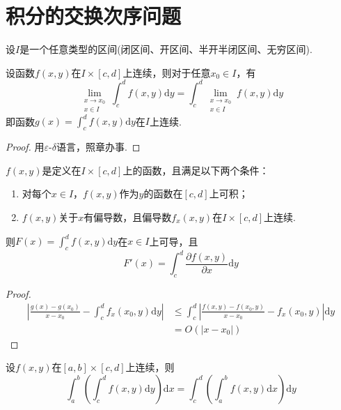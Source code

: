 \section{积分的交换次序问题}

设$I$是一个任意类型的区间(闭区间、开区间、半开半闭区间、无穷区间).

\begin{theorem}[极限与积分交换次序]\label{thm:limit-and-integral-exchange}
    设函数$f(x,y)$在$I\times [c,d]$上连续，则对于任意$x_0\in I$，有
    \[
        \lim_{\substack{x\to x_0\\x\in I}}\int_c^d f(x,y)\mathrm{d} y = \int_c^d \lim_{\substack{x\to x_0\\x\in I}}f(x,y)\mathrm{d} y
    \]
    即函数$g(x)=\int_c^d f(x,y)\mathrm{d} y$在$I$上连续.
\end{theorem}

\begin{proof}
    用$\varepsilon$-$\delta$语言，照章办事.
\end{proof}

\begin{theorem}[导数与积分交换次序]\label{thm:derivative-and-integral-exchange}
    $f(x,y)$是定义在$I\times [c,d]$上的函数，且满足以下两个条件：
    \begin{enumerate}
        \item 对每个$x\in I$，$f(x,y)$作为$y$的函数在$[c,d]$上可积；
        \item $f(x,y)$关于$x$有偏导数，且偏导数$f_x(x,y)$在$I\times [c,d]$上连续.
    \end{enumerate}
    则$F(x)=\int_c^d f(x,y)\mathrm{d} y$在$x\in I$上可导，且
    \[
        F'(x)=\int_c^d \frac{\partial f(x,y)}{\partial x}\mathrm{d} y
    \]
\end{theorem}

\begin{proof}
    \begin{align*}
        \left|\frac{g(x)-g\left(x_0\right)}{x-x_0}-\int_c^d f_x\left(x_0, y\right) \mathrm{d} y\right| &\leqslant \int_c^d\left|\frac{f(x, y)-f\left(x_0, y\right)}{x-x_0}-f_x\left(x_0, y\right)\right| \mathrm{d} y \\
        &=O(|x-x_0|)
    \end{align*}
\end{proof}

\begin{theorem}[积分交换次序]\label{thm:integral-exchange}
    设$f(x,y)$在$[a,b]\times [c,d]$上连续，则
    \[
        \int_a^b\left(\int_c^d f(x,y)\mathrm{d} y\right)\mathrm{d} x = \int_c^d\left(\int_a^b f(x,y)\mathrm{d} x\right)\mathrm{d} y
    \]
\end{theorem}

